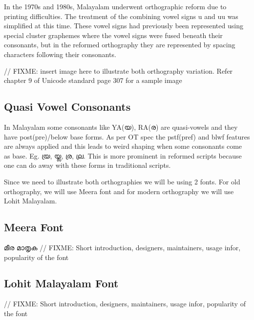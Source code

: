 In the 1970s and 1980s, Malayalam underwent orthographic reform due to
printing difficulties. The treatment of the combining vowel signs u
and uu was simplified at this time. These vowel signs had previously
been represented using special cluster graphemes where the vowel signs
were fused beneath their consonants, but in the reformed orthography
they are represented by spacing characters following their consonants.

// FIXME: insert image here to illustrate both orthography
variation. Refer chapter 9 of Unicode standard page 307 for a sample
image

\subsection {Quasi Vowel Consonants}
In Malayalam some consonants like YA({\meera യ}), RA({\meera ര}) are quasi-vowels and they have post(pre)/below base forms. As per OT spec the pstf(pref) and blwf features are always applied and this leads to weird shaping when some consonants come as base. Eg. {\meera യ്ര, യ്ല, ര്ര, ല്ര}. This is more prominent in reformed scripts because one can do away with these forms in traditional scripts.


Since we need to illustrate both orthographies we will be using 2
fonts. For old orthography, we will use Meera font and for modern
orthography we will use Lohit Malayalam.

\subsection {Meera Font}
{\meera മീര മാതൃക }
// FIXME: Short introduction, designers, maintainers, usage infor,
popularity of the font

\subsection {Lohit Malayalam Font}
// FIXME: Short introduction, designers, maintainers, usage infor,
popularity of the font

